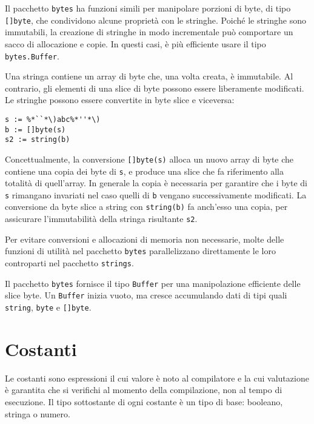 Il pacchetto \verb|bytes| ha funzioni simili per manipolare porzioni di byte, di tipo \verb|[]byte|, che condividono alcune proprietà con le stringhe.
Poiché le stringhe sono immutabili, la creazione di stringhe in modo incrementale può comportare un sacco di allocazione e copie.
In questi casi, è più efficiente usare il tipo \verb|bytes.Buffer|.

Una stringa contiene un array di byte che, una volta creata, è immutabile.
Al contrario, gli elementi di una slice di byte possono essere liberamente modificati.
Le stringhe possono essere convertite in byte slice e viceversa:
\begin{lstlisting}[frame = single, label = {lst:lstlisting2-2-4.1}]
s := %*``*\)abc%*''*\)
b := []byte(s)
s2 := string(b)
\end{lstlisting}
Concettualmente, la conversione \verb|[]byte(s)| alloca un nuovo array di byte che contiene una copia dei byte di \verb|s|, e produce una slice che fa riferimento alla totalità di quell'array.
In generale la copia è necessaria per garantire che i byte di \verb|s| rimangano invariati nel caso quelli di \verb|b| vengano successivamente modificati.
La conversione da byte slice a string con \verb|string(b)| fa anch'esso una copia, per assicurare l'immutabilità della stringa risultante \verb|s2|.

Per evitare conversioni e allocazioni di memoria non necessarie, molte delle funzioni di utilità nel pacchetto \verb|bytes| parallelizzano direttamente le loro controparti nel pacchetto \verb|strings|.

Il pacchetto \verb|bytes| fornisce il tipo \verb|Buffer| per una manipolazione efficiente delle slice byte.
Un \verb|Buffer| inizia vuoto, ma cresce accumulando dati di tipi quali \verb|string|, \verb|byte| e \verb|[]byte|.


\section{Costanti}
\label{sec:costanti}%
Le costanti sono espressioni il cui valore è noto al compilatore e la cui valutazione è garantita che si verifichi al momento della compilazione, non al tempo di esecuzione.
Il tipo sottostante di ogni costante è un tipo di base: booleano, stringa o numero.

